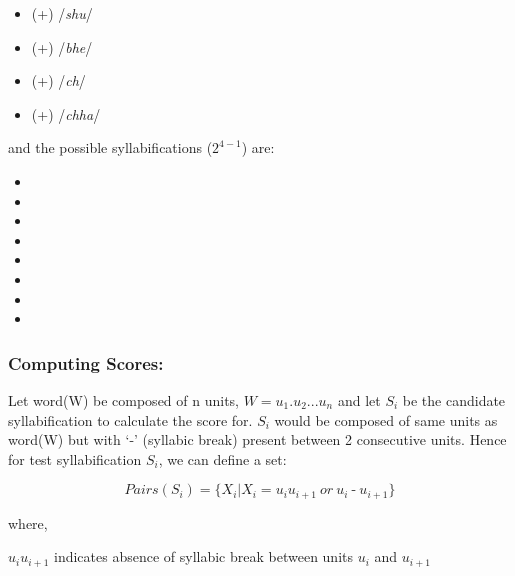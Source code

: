 \documentclass[runningheads,a4paper]{llncs}
\DeclareMathOperator{\dash}{-}
\begin{document}
\begin{multicols}{2}
\begin{itemize}[noitemsep,topsep=0pt,parsep=0pt,partopsep=0pt]
    \item {} ({}+{}) /\emph{shu}/
    \item {} ({}+{}) /\emph{bhe}/
    \item {} ({}+{}) /\emph{ch}/
    \item {} ({}+{}) /\emph{chha}/
\end{itemize}
\end{multicols}

and the possible syllabifications ($2^{4-1}$) are:

\begin{multicols}{2}
\begin{itemize} \itemsep0pt \parskip0pt 
  \item {}
  \item {}
  \item {}
  \item {}
  \item {}
  \item {}
  \item {}
  \item {}
\end{itemize}
\end{multicols}

\subsubsection*{Computing Scores: }

Let word(W) be composed of n units, $W = u_1.u_2 ... u_n $ and let $S_i$ be the candidate syllabification to calculate the score for. $S_i$ would be composed of same units as word(W) but with `-' (syllabic break) present between 2 consecutive units. Hence for test syllabification $S_i$, we can define a set:

\begin{equation}
Pairs(S_i)=\{ X_i| X_i = u_{i}u_{i+1}
\ or \ 
u_{i} \dash u_{i+1} \}
\end{equation}

where,

\begin{small}
$u_{i}u_{i+1}$ indicates absence of syllabic break between units $u_i$ and $u_{i+1}$
\end{small}
\end{document}
